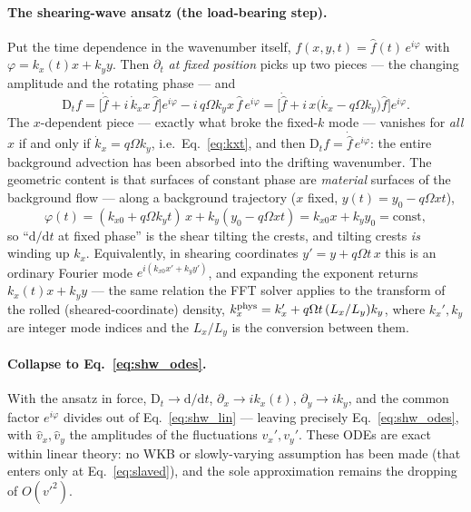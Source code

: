 \documentclass[11pt]{article}
\newcommand{\dd}{\mathrm{d}}
\begin{document}
\paragraph{The shearing-wave ansatz (the load-bearing step).} Put the time
dependence in the wavenumber itself,
$f(x,y,t) = \hat f(t)\,e^{i\varphi}$ with $\varphi = k_x(t)x + k_yy$. Then
$\partial_t$ \emph{at fixed position} picks up two pieces --- the changing
amplitude and the rotating phase --- and
\begin{equation}
\mathrm{D}_t f
= \Big[\dot{\hat f} + i\,\dot k_x x\,\hat f\Big]e^{i\varphi}
  - i\,q\Omega k_y x\,\hat f\,e^{i\varphi}
= \Big[\dot{\hat f} + i\,x\big(\dot k_x - q\Omega k_y\big)\hat f\Big]e^{i\varphi}.
\end{equation}
The $x$-dependent piece --- exactly what broke the fixed-$k$ mode --- vanishes
for \emph{all} $x$ if and only if $\dot k_x = q\Omega k_y$, i.e.\
Eq.~\eqref{eq:kxt}, and then $\mathrm{D}_t f = \dot{\hat f}\,e^{i\varphi}$: the
entire background advection has been absorbed into the drifting wavenumber. The
geometric content is that surfaces of constant phase are \emph{material} surfaces
of the background flow --- along a background trajectory ($x$ fixed,
$y(t) = y_0 - q\Omega x t$),
\begin{equation}
\varphi(t) = (k_{x0} + q\Omega k_yt)\,x + k_y(y_0 - q\Omega x t)
 = k_{x0}x + k_yy_0 = \text{const},
\end{equation}
so ``$\dd/\dd t$ at fixed phase'' is the shear tilting the crests, and tilting
crests \emph{is} winding up $k_x$. Equivalently, in shearing coordinates
$y' = y + q\Omega t\,x$ this is an ordinary Fourier mode
$e^{i(k_{x0}x' + k_yy')}$, and expanding the exponent returns
$k_x(t)x + k_yy$ --- the same relation the FFT solver applies to the transform of
the rolled (sheared-coordinate) density, $k_x^{\rm phys} = k_x' + q\Omega
t\,(L_x/L_y)k_y$, where $k_x', k_y$ are integer mode indices and the $L_x/L_y$ is
the conversion between them.

\paragraph{Collapse to Eq.~\eqref{eq:shw_odes}.} With the ansatz in force,
$\mathrm{D}_t \to \dd/\dd t$, $\partial_x \to ik_x(t)$, $\partial_y \to ik_y$,
and the common factor $e^{i\varphi}$ divides out of
Eq.~\eqref{eq:shw_lin} --- leaving precisely Eq.~\eqref{eq:shw_odes}, with
$\hat v_x, \hat v_y$ the amplitudes of the fluctuations $v_x', v_y'$. These ODEs
are exact within linear theory: no WKB or slowly-varying assumption has been made
(that enters only at Eq.~\eqref{eq:slaved}), and the sole approximation remains
the dropping of $O(v'^2)$.
\end{document}

